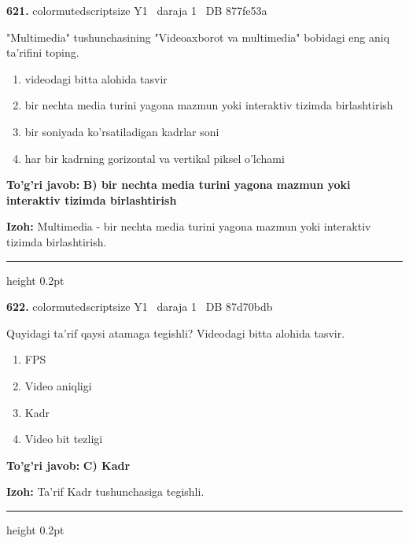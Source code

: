 \documentclass[10pt,a4paper,oneside]{article}
\begin{document}
\noindent\textbf{\color{ink}621.}  {color{muted}scriptsize Y1 \textbullet\ daraja 1 \textbullet\ DB 877fe53a}
\par
"Multimedia" tushunchasining "Videoaxborot va multimedia" bobidagi eng aniq ta'rifini toping.
\begin{enumerate}[label=\Alph*),leftmargin=9mm]
\item videodagi bitta alohida tasvir
\item bir nechta media turini yagona mazmun yoki interaktiv tizimda birlashtirish
\item bir soniyada ko'rsatiladigan kadrlar soni
\item har bir kadrning gorizontal va vertikal piksel o'lchami
\end{enumerate}
\begin{tcolorbox}[enhanced,breakable,colback=teal!4,colframe=teal!50!black,boxrule=0.5pt,arc=1.1mm,left=3mm,right=3mm,top=1.7mm,bottom=1.7mm,before skip=2mm,after skip=2mm]
\textbf{\color{teal}To'g'ri javob:} \textbf{B) bir nechta media turini yagona mazmun yoki interaktiv tizimda birlashtirish}
\par\smallskip
\textbf{Izoh:} Multimedia - bir nechta media turini yagona mazmun yoki interaktiv tizimda birlashtirish.
\end{tcolorbox}
\vspace{2mm}\hrule height 0.2pt \vspace{3mm}

\noindent\textbf{\color{ink}622.}  {color{muted}scriptsize Y1 \textbullet\ daraja 1 \textbullet\ DB 87d70bdb}
\par
Quyidagi ta'rif qaysi atamaga tegishli? Videodagi bitta alohida tasvir.
\begin{enumerate}[label=\Alph*),leftmargin=9mm]
\item FPS
\item Video aniqligi
\item Kadr
\item Video bit tezligi
\end{enumerate}
\begin{tcolorbox}[enhanced,breakable,colback=teal!4,colframe=teal!50!black,boxrule=0.5pt,arc=1.1mm,left=3mm,right=3mm,top=1.7mm,bottom=1.7mm,before skip=2mm,after skip=2mm]
\textbf{\color{teal}To'g'ri javob:} \textbf{C) Kadr}
\par\smallskip
\textbf{Izoh:} Ta'rif Kadr tushunchasiga tegishli.
\end{tcolorbox}
\vspace{2mm}\hrule height 0.2pt \vspace{3mm}
\end{document}
